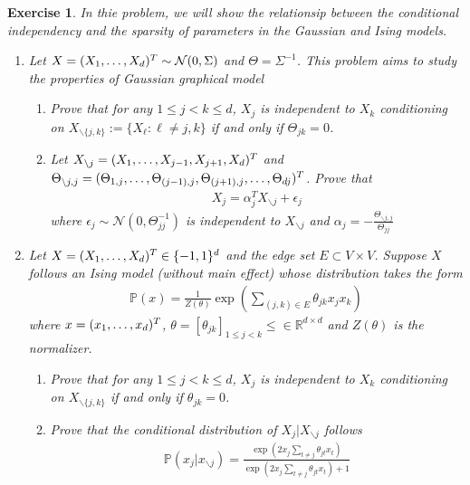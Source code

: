 \documentclass[12pt]{article}
\theoremstyle{colon}
\newtheorem{exercise}{Exercise}
\begin{document}
\begin{exercise}
  In thie problem, we will show the relationsip between the conditional independency and the sparsity of parameters in the Gaussian and Ising models.
  \begin{enumerate}[label=\arabic*)]
    \item Let $X = (X_1, \mathellipsis, X_d)^T \sim \mathcal{N}(0, \Sigma)$ and $\Theta = \Sigma^{-1}$. This problem aims to study the properties of Gaussian graphical model
      \begin{enumerate}[label=\alph*)]
        \item Prove that for any $1 \leq j < k \leq d$, $X_j$ is independent to $X_k$ conditioning on $X_{\backslash\{j,k\}} := \{X_\ell : \ell \neq j,k \}$ if and only if $\Theta_{jk} = 0$.
        \item Let $X_{\backslash j} = (X_1, \mathellipsis, X_{j-1}, X_{j+1}, X_d)^T$ and \\ $\Theta_{\backslash j,j} = (\Theta_{1,j}, \mathellipsis, \Theta_{(j-1),j}, \Theta_{(j+1),j}, \mathellipsis, \Theta_{dj})^T$. Prove that
          \begin{gather*}
            X_j = \alpha_j^T X_{\backslash j} + \epsilon_j
          \end{gather*}
          where $\epsilon_j \sim \mathcal{N}(0, \Theta_{jj}^{-1})$ is independent to $X_{\backslash j}$ and $\alpha_j = -\frac{\Theta_{\backslash j, j}}{\Theta_{jj}}$
      \end{enumerate}

    \item Let $X = (X_1, \mathellipsis, X_d)^T \in \{-1,1\}^d$ and the edge set $E \subset V \times V$. Suppose $X$ follows an Ising model (without main effect) whose distribution takes the form
      \begin{gather*}
        \mathbb{P}(x) = \frac{1}{Z(\theta)} \exp \left( \sum_{(j,k) \in E} \theta_{jk} x_j x_k \right)
      \end{gather*}
      where $x = (x_1, \mathellipsis, x_d)^T$, $\theta = [\theta_{jk}]_{1 \leq j < k} \leq \in \mathbb{R}^{d \times d}$ and $Z(\theta)$ is the normalizer.

      \begin{enumerate}[label=\alph*)]
        \item Prove that for any $1 \leq j < k \leq d$, $X_j$ is independent to $X_k$ conditioning on $X_{\backslash\{j,k\}}$ if and only if $\theta_{jk} = 0$.
        \item Prove that the conditional distribution of $X_j | X_{\backslash j}$ follows
          \begin{gather*}
            \mathbb{P}(x_j | x_{\backslash j}) = \frac{\exp(2 x_j \sum_{t \neq j} \theta_{jt} x_t)}{\exp(2 x_j \sum_{t \neq j} \theta_{jt} x_t) + 1}
          \end{gather*}
      \end{enumerate}
  \end{enumerate}
\end{exercise}
\end{document}
